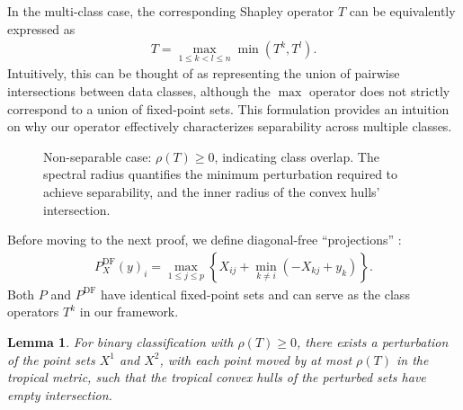 \documentclass{article}
\newtheorem{lemma}[theorem]{Lemma}
\begin{document}
In the multi-class case, the corresponding Shapley operator $T$ can be equivalently expressed as
\begin{align}
T = \max_{1 \leq k < l \leq n}\min(T^k, T^l).
\end{align}
Intuitively, this can be thought of as representing the union of pairwise intersections between data classes, although the $\max$ operator does not strictly correspond to a union of fixed-point sets. This formulation provides an intuition on why our operator effectively characterizes separability across multiple classes.

\begin{figure}[htbp]
    \centering
    \resizebox{0.5\textwidth}{!}{\clipbox{0.15\width{} 0.15\height{} 0.15\width{} 0.15\height{}}{}}
    \caption{Non-separable case: $\rho(T) \geq 0$, indicating class overlap. The spectral radius quantifies the minimum perturbation required to achieve separability, and the inner radius of the convex hulls' intersection.}
    \label{fig:non_separable}
\end{figure}

Before moving to the next proof, we define diagonal-free ``projections'' \cite{gaubert2011}:
\begin{align}
P_X^{\text{DF}}(y)_i = \max_{1 \leq j \leq p} \left\{X_{ij} + \min_{k \neq i} (-X_{kj} + y_k)\right\}.
\end{align}
Both $P$ and $P^\text{DF}$ have identical fixed-point sets and can serve as the class operators $T^k$ in our framework.


\begin{lemma}\label{lemma:perturbation}
For binary classification with $\rho(T) \geq 0$, there exists a perturbation of the point sets $X^1$ and $X^2$, with each point moved by at most $\rho(T)$ in the tropical metric, such that the tropical convex hulls of the perturbed sets have empty intersection.
\end{lemma}
\end{document}
